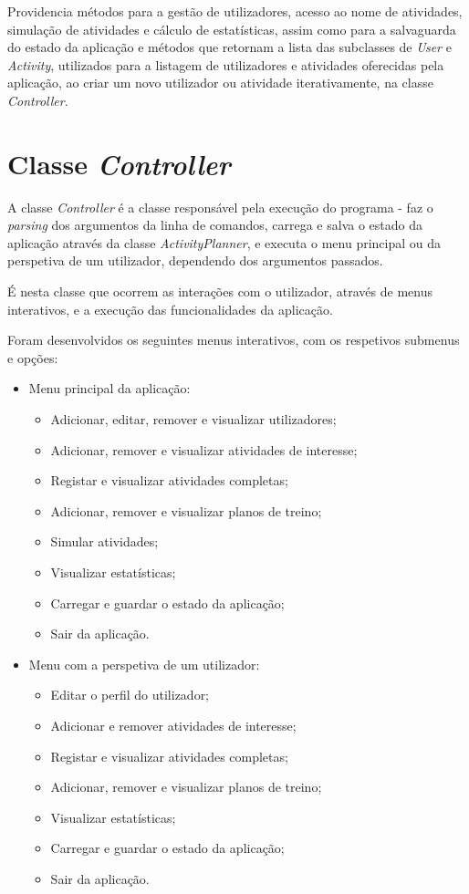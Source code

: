 \documentclass[a4paper,12pt]{scrreprt}
\begin{document}
    Providencia métodos para a gestão de utilizadores, acesso ao nome de atividades, simulação de atividades e cálculo de estatísticas,
    assim como para a salvaguarda do estado da aplicação e métodos que retornam a lista das subclasses de \textit{User} e \textit{Activity},
    utilizados para a listagem de utilizadores e atividades oferecidas pela aplicação, ao criar um novo utilizador ou atividade iterativamente,
    na classe \textit{Controller}.

\section{Classe \textit{Controller}}
    A classe \textit{Controller} é a classe responsável pela execução do programa -
    faz o \textit{parsing} dos argumentos da linha de comandos,
    carrega e salva o estado da aplicação através da classe \textit{ActivityPlanner},
    e executa o menu principal ou da perspetiva de um utilizador, dependendo dos argumentos passados.

    É nesta classe que ocorrem as interações com o utilizador, através de menus interativos,
    e a execução das funcionalidades da aplicação.

    Foram desenvolvidos os seguintes menus interativos, com os respetivos submenus e opções:
    \begin{itemize}
        \item Menu principal da aplicação:
        \begin{itemize}
            \item Adicionar, editar, remover e visualizar utilizadores;
            \item Adicionar, remover e visualizar atividades de interesse;
            \item Registar e visualizar atividades completas;
            \item Adicionar, remover e visualizar planos de treino;
            \item Simular atividades;
            \item Visualizar estatísticas;
            \item Carregar e guardar o estado da aplicação;
            \item Sair da aplicação.
        \end{itemize}
        \item Menu com a perspetiva de um utilizador:
        \begin{itemize}
            \item Editar o perfil do utilizador;
            \item Adicionar e remover atividades de interesse;
            \item Registar e visualizar atividades completas;
            \item Adicionar, remover e visualizar planos de treino;
            \item Visualizar estatísticas;
            \item Carregar e guardar o estado da aplicação;
            \item Sair da aplicação.
        \end{itemize}
    \end{itemize}
\end{document}

